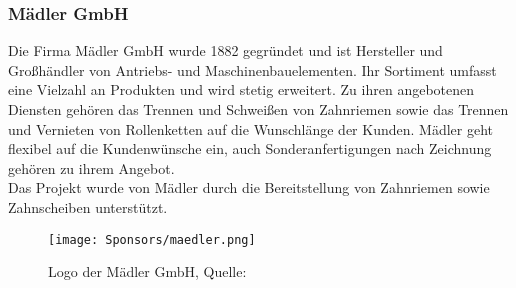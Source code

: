 \subsubsection{Mädler GmbH}
Die Firma Mädler GmbH wurde 1882 gegründet und ist Hersteller und Großhändler von Antriebs- und Maschinenbauelementen. Ihr Sortiment umfasst eine Vielzahl an Produkten und wird stetig erweitert. Zu ihren angebotenen Diensten gehören das Trennen und Schweißen von Zahnriemen sowie das Trennen und Vernieten von Rollenketten auf die Wunschlänge der Kunden. Mädler geht flexibel auf die Kundenwünsche ein, auch Sonderanfertigungen nach Zeichnung gehören zu ihrem Angebot.\cite{mädler}\\
Das Projekt wurde von Mädler durch die Bereitstellung von Zahnriemen sowie Zahnscheiben unterstützt.

\begin{figure}[H]
    \centering
    \texttt{[image: Sponsors/maedler.png]}
    \caption{Logo der Mädler GmbH, Quelle: \cite{maedler_logo}}
    \label{fig:maedler_logo}
\end{figure}


